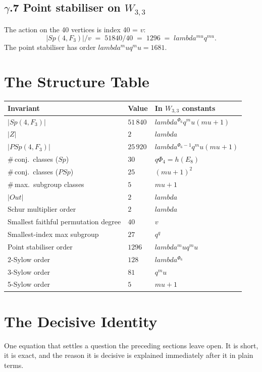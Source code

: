 \documentclass[12pt,a4paper]{article}
\def\mathbb#1{#1}%
\def\mathrm#1{#1}%
\def\lambda{lambda}%
\def\mu{mu}%
\def\Phi#1{Phi#1}%
\def\cdot{ }%
\theoremstyle{definition}
\newcommand{\Sp}{\mathrm{Sp}}
\newcommand{\PSp}{\mathrm{PSp}}
\newcommand{\FF}{\mathbb{F}}
\begin{document}
\subsection*{$\gamma$.7 \quad Point stabiliser on $W_{3,3}$}
The action on the 40 vertices is index 40 = $v$:
\[
|\Sp(4,\FF_3)|/v \;=\; 51840/40 \;=\; 1296 \;=\; \lambda^{\mu}\cdot q^{\mu}.
\]
The point stabiliser has order $\lambda^\mu q^\mu = 16\cdot 81$.

\section*{The Structure Table}

\begin{center}
\renewcommand{\arraystretch}{1.3}
\begin{tabular}{lll}
\toprule
Invariant & Value & In $W_{3,3}$ constants \\
\midrule
$|\Sp(4,\FF_3)|$ & $51\,840$ & $\lambda^{\Phi_6}q^\mu(\mu+1)$ \\
$|Z|$ & $2$ & $\lambda$ \\
$|\PSp(4,\FF_3)|$ & $25\,920$ & $\lambda^{\Phi_6-1}q^\mu(\mu+1)$ \\
\#\,conj.\ classes ($\Sp$) & $30$ & $q\Phi_4 = h(E_8)$ \\
\#\,conj.\ classes ($\PSp$) & $25$ & $(\mu+1)^2$ \\
\#\,max.\ subgroup classes & $5$ & $\mu+1$ \\
$|\mathrm{Out}|$ & $2$ & $\lambda$ \\
Schur multiplier order & $2$ & $\lambda$ \\
Smallest faithful permutation degree & $40$ & $v$ \\
Smallest-index max subgroup & $27$ & $q^q$ \\
Point stabiliser order & $1296$ & $\lambda^\mu q^\mu$ \\
2-Sylow order & $128$ & $\lambda^{\Phi_6}$ \\
3-Sylow order & $81$ & $q^\mu$ \\
5-Sylow order & $5$ & $\mu+1$ \\
\bottomrule
\end{tabular}
\end{center}

\section*{The Decisive Identity}

\begin{plainbox}
One equation that settles a question the preceding sections leave open. It is short,
it is exact, and the reason it is decisive is explained immediately after it in plain
terms.
\end{plainbox}
\end{document}
